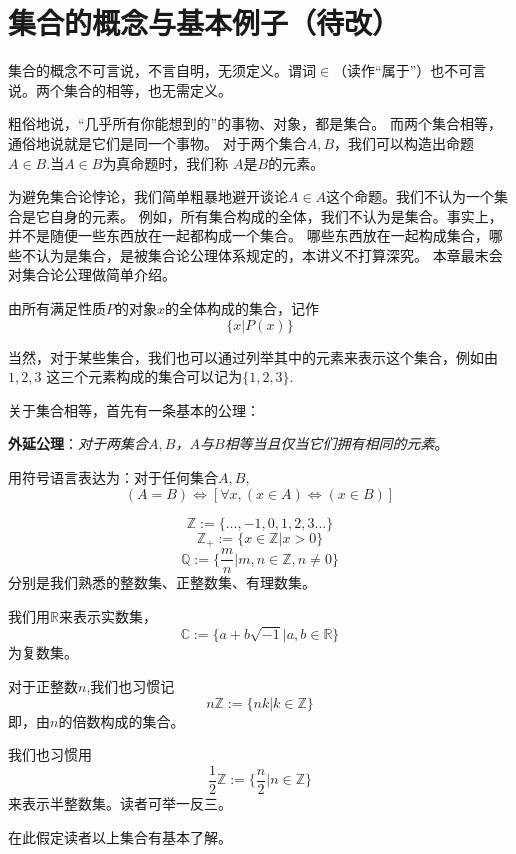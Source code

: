 
\section{集合的概念与基本例子（待改）}

\begin{definition}
集合的概念不可言说，不言自明，无须定义。谓词$\in$（读作“属于”）也不可言说。两个集合的相等，也无需定义。
\end{definition}
粗俗地说，“几乎所有你能想到的”的事物、对象，都是集合。
而两个集合相等，通俗地说就是它们是同一个事物。
对于两个集合$A,B$，我们可以构造出命题$A\in B$.当$A\in B$为真命题时，我们称
$A$是$B$的元素。

为避免集合论悖论，我们简单粗暴地避开谈论$A\in A$这个命题。我们不认为一个集合是它自身的元素。
例如，所有集合构成的全体，我们不认为是集合。事实上，并不是随便一些东西放在一起都构成一个集合。
哪些东西放在一起构成集合，哪些不认为是集合，是被集合论公理体系规定的，本讲义不打算深究。
本章最末会对集合论公理做简单介绍。\vs

由所有满足性质$P$的对象$x$的全体构成的集合，记作
$$\{x|P(x)\}$$

当然，对于某些集合，我们也可以通过列举其中的元素来表示这个集合，例如由$1,2,3$
这三个元素构成的集合可以记为$\{1,2,3\}$.

关于集合相等，首先有一条基本的公理：\vs

\textbf{外延公理}：\emph{对于两集合$A,B$，$A$与$B$相等当且仅当它们拥有相同的元素}。

用符号语言表达为：对于任何集合$A,B$,
$$(A=B)\Leftrightarrow[\forall x,(x\in A)\Leftrightarrow(x\in B)]$$

\begin{example}[常见的集合及其记号]
$$\mathbb{Z}:=\{...,-1,0,1,2,3...\}$$
$$\mathbb{Z_+}:=\{x\in\mathbb{Z}|x>0\}$$
$$\mathbb{Q}:=\{\frac{m}{n}|m,n\in\mathbb{Z},n\neq0\}$$
分别是我们熟悉的整数集、正整数集、有理数集。
\end{example}
我们用$\mathbb{R}$来表示实数集，
$$\mathbb{C}:=\{a+b\sqrt{-1}|a,b\in\mathbb{R}\}$$
为复数集。

\begin{example}对于正整数$n$,我们也习惯记
$$n\mathbb{Z}:=\{nk|k\in\mathbb{Z}\}$$
即，由$n$的倍数构成的集合。
\end{example}

我们也习惯用
$$\frac{1}{2}\mathbb{Z}:=\{\frac{n}{2}|n\in\mathbb{Z}\}$$
来表示半整数集。读者可举一反三。

在此假定读者以上集合有基本了解。

